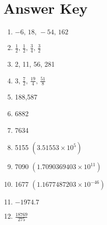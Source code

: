 \newpage

\section{Answer Key}

\begin{enumerate}
	\item $-6, \, 18, \, -54, \, 162$
    \item $\frac{1}{2}, \, \frac{1}{2}, \, \frac{3}{4}, \, \frac{3}{2}$
    \item 2, 11, 56, 281
    \item $3, \, \frac{7}{2}, \, \frac{19}{4}, \, \frac{51}{8}$
    \item 188,587
    \item 6882
    \item 7634
    \item 5155 $(3.51553 \times 10^5)$
	\item 7090 $(1.7090369403 \times 10^{11})$
	\item 1677 $(1.1677487203 \times 10^{-46})$
	\item $-1974.7$
    \item $\frac{18769}{275}$
\end{enumerate}